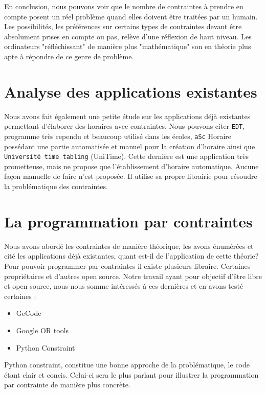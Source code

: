 En conclusion, nous pouvons voir que le nombre de contraintes à prendre en compte posent un réel problème quand elles doivent être traitées par un humain. Les possibilités, les préférences sur certains types de contraintes devant être absolument prises en compte ou pas, relève d'une réflexion de haut niveau. Les ordinateurs "réfléchissant" de manière plus "mathématique" son en théorie plus apte à répondre de ce genre de problème.

\section{Analyse des applications existantes}
Nous avons fait également une petite étude sur les applications déjà existantes permettant d'élaborer des horaires avec contraintes. Nous pouvons citer \texttt{EDT}, programme très rependu et beaucoup utilisé dans les écoles, \texttt{aSc} Horaire possédant une partie automatisée et manuel pour la création d'horaire ainsi que \texttt{Université time tabling} (UniTime). Cette dernière est une application très prometteuse, mais ne propose que l'établissement d'horaire automatique. Aucune façon manuelle de faire n'est proposée. Il utilise sa propre librairie pour résoudre la problématique des contraintes.

\section{La programmation par contraintes}
Nous avons abordé les contraintes de manière théorique, les avons énumérées et cité les applications déjà existantes, quant est-il de l'application de cette théorie? Pour pouvoir programmer par contraintes il existe plusieurs libraire. Certaines propriétaires et d'autres open source. Notre travail ayant pour objectif d'être libre et open source, nous nous somme intéressés à ces dernières et en avons testé certaines :\\
\begin{itemize}
\item GeCode
\item Google OR tools
\item Python Constraint
\end{itemize}
\bigskip

Python constraint, constitue une bonne approche de la problématique, le code étant clair et concis. Celui-ci sera le plus parlant pour illustrer la programmation par contrainte de manière plus concrète.

